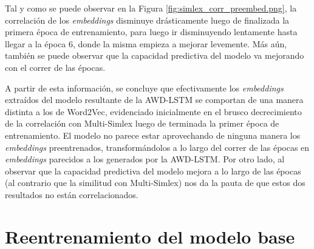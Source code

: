 Tal y como se puede observar en la Figura \ref{fig:simlex_corr_preembed.png}, la correlación de los 
\textit{embeddings} disminuye drásticamente luego de finalizada la primera época 
de entrenamiento, para luego ir disminuyendo lentamente hasta llegar 
a la época $6$, donde la misma empieza a mejorar levemente. Más aún, también 
se puede observar que la capacidad predictiva del modelo va mejorando 
con el correr de las épocas.


A partir de esta información, se concluye que efectivamente los \textit{embeddings} 
extraídos del modelo resultante de la AWD-LSTM se comportan de una manera 
distinta a los de Word2Vec, evidenciado inicialmente en el brusco decrecimiento 
de la correlación con Multi-Simlex luego de terminada la primer época de 
entrenamiento. El modelo no parece estar aprovechando de ninguna manera 
los \textit{embeddings} preentrenados, transformándolos a lo largo del correr de 
las épocas en \textit{embeddings} parecidos a los generados por la AWD-LSTM.
Por otro lado, al observar que la capacidad predictiva del modelo mejora a 
lo largo de las épocas (al contrario que la similitud con Multi-Simlex) nos da 
la pauta de que estos dos resultados no están correlacionados.

\section{Reentrenamiento del modelo base}

